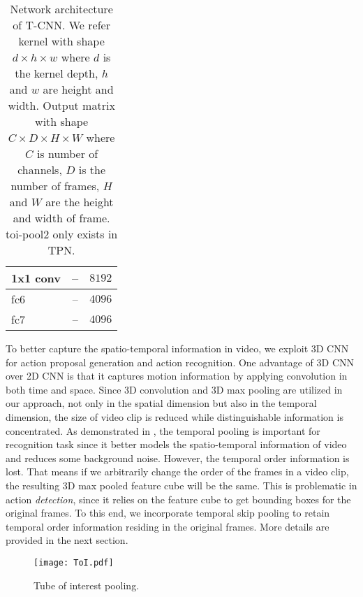 \documentclass[10pt,twocolumn,letterpaper]{article}
\begin{document}
\begin{table}
\begin{center}
\begin{tabular}{lcc}
1x1 conv        & --                & $8192$ \\
\hline
fc6             & --                & $4096$ \\
fc7             & --                & $4096$ \\
\hline
\end{tabular}
\caption{Network architecture of T-CNN. We refer kernel with shape $d\times h \times w$ where $d$ is the kernel depth, $h$ and $w$ are height and width. Output matrix with shape $C\times D\times H\times W$ where $C$ is number of channels, $D$ is the number of frames, $H$ and $W$ are the height and width of frame. toi-pool2 only exists in TPN.}
\label{tab:architecture}
\end{center}
\end{table}

To better capture the spatio-temporal information in video, we exploit 3D CNN for action proposal generation and action recognition. One advantage of 3D CNN over 2D CNN is that it captures motion information by applying convolution in both time and space. Since 3D convolution and 3D max pooling are utilized in our approach, not only in the spatial dimension but also in the temporal dimension, the size of video clip is reduced while distinguishable information is concentrated. As demonstrated in \cite{c3d}, the temporal pooling is important for recognition task since it better models the spatio-temporal information of video and reduces some background noise. However, the temporal order information is lost. That means if we arbitrarily change the order of the frames in a video clip, the resulting 3D max pooled feature cube will be the same. This is problematic in action {\em detection}, since it relies on the feature cube to get bounding boxes for the original frames. To this end, we incorporate temporal skip pooling to retain temporal order information residing in the original frames. More details are provided in the next section.











\begin{figure}[!htb]
\centering
\texttt{[image: ToI.pdf]}
\caption{Tube of interest pooling.}
\label{fig:toi_pool}
\end{figure}
\end{document}
